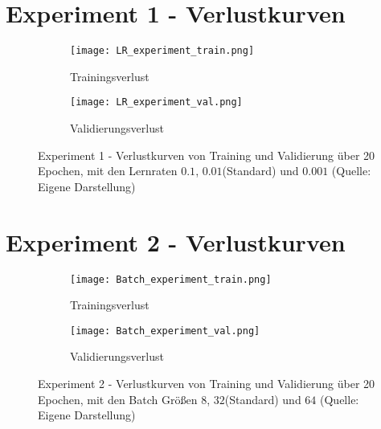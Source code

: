 
\chapter{Experiment 1 - Verlustkurven}
\label{appendix:Experiment1Verlustkurven}
\begin{figure}[ht]
	\centering
	\begin{subfigure}[b]{0.8\textwidth}
		\centering
		\texttt{[image: LR\_experiment\_train.png]}
		\caption{Trainingsverlust}
		\label{fig:ex1_lr_train}
	\end{subfigure}
	\vfil
	\begin{subfigure}[b]{0.8\linewidth}
		\centering
		\texttt{[image: LR\_experiment\_val.png]}
		\caption{Validierungsverlust}
		\label{fig:ex1_lr_val}
	\end{subfigure}
	\caption{Experiment 1 - Verlustkurven von Training und Validierung über 20 Epochen, mit den Lernraten $0.1$, $0.01$(Standard) und $0.001$ (Quelle: Eigene Darstellung)}
\end{figure} 

\chapter{Experiment 2 - Verlustkurven}
\label{appendix:Experiment2Verlustkurven}
\begin{figure}[ht]
	\centering
	\begin{subfigure}[b]{0.8\textwidth}
		\centering
		\texttt{[image: Batch\_experiment\_train.png]}
		\caption{Trainingsverlust}
		\label{fig:ex2_batch_train}
	\end{subfigure}
	\vfil
	\begin{subfigure}[b]{0.8\linewidth}
		\centering
		\texttt{[image: Batch\_experiment\_val.png]}
		\caption{Validierungsverlust}
		\label{fig:ex2_batch_val}
	\end{subfigure}
	\caption{Experiment 2 - Verlustkurven von Training und Validierung über 20 Epochen, mit den Batch Größen $8$, $32$(Standard) und $64$ (Quelle: Eigene Darstellung)}
\end{figure} 

